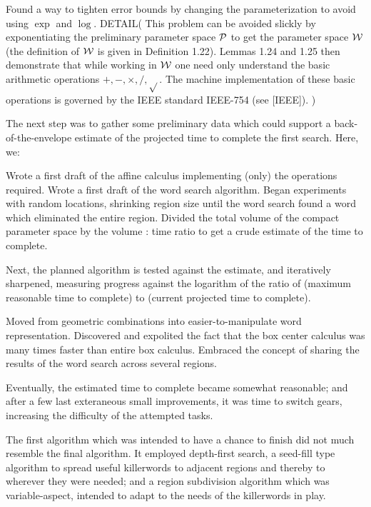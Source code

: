 \begin{itemize}
\begin{itemize}
   Found a way to tighten error bounds by changing the parameterization to avoid using $\exp$ and $\log$.
DETAIL(
This problem can be  avoided slickly by exponentiating the preliminary parameter space ${\cal P}$ to get the parameter space ${\cal W}$ (the
definition of ${\cal W}$ is given in Definition 1.22).   Lemmas 1.24 and 1.25 then demonstrate
that while working in ${\cal W}$ one need only
understand the basic arithmetic operations $+, -, \times, /, \sqrt{}$.
The machine implementation of these basic operations is governed by the IEEE standard IEEE-754 (see [IEEE]).
)
\end{itemize}

The next step was to gather some preliminary data which could support a back-of-the-envelope
estimate of the projected time to complete the first search. Here, we:
\begin{itemize}
   Wrote a first draft of the affine calculus implementing (only) the operations required.
   Wrote a first draft of the word search algorithm.
   Began experiments with random locations, shrinking region size until the word search found a word which eliminated the entire region.
   Divided the total volume of the compact parameter space by the volume : time ratio to get a crude estimate of the time to complete.
\end{itemize}

Next, the planned algorithm is tested against the estimate, and iteratively sharpened,
measuring progress against the logarithm of the ratio of (maximum reasonable time to complete) to (current projected time to complete).
\begin{itemize}
  Moved from geometric combinations into easier-to-manipulate word representation.
  Discovered and expolited the fact that the box center calculus was many times faster than entire box calculus.
  Embraced the concept of sharing the results of the word search across several regions.
\end{itemize}

Eventually, the estimated time to complete became somewhat reasonable;
and after a few last exteraneous small improvements, it was time to switch gears, increasing the difficulty of the attempted tasks.

The first algorithm which was intended to have a chance to finish did not much resemble the final algorithm. It employed depth-first search, a seed-fill type algorithm to spread useful killerwords to adjacent regions and thereby to wherever they were needed; and a region subdivision algorithm which was variable-aspect, intended to adapt to the needs of the killerwords in play.


\end{itemize}
